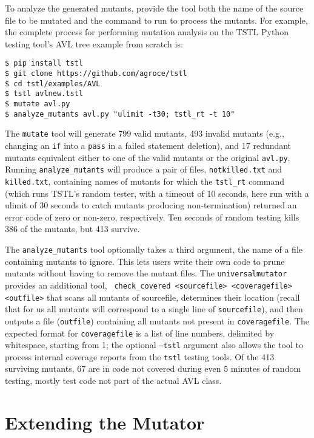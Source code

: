 To analyze the generated mutants, provide the tool both the name of the
source file to be mutated and the command to run to process the
mutants.  For example, the complete process for performing mutation
analysis on the TSTL \cite{tstlsttt,nfm15} Python testing tool's AVL tree example from scratch is:

{\scriptsize
\begin{verbatim}
$ pip install tstl
$ git clone https://github.com/agroce/tstl
$ cd tstl/examples/AVL
$ tstl avlnew.tstl
$ mutate avl.py
$ analyze_mutants avl.py "ulimit -t30; tstl_rt -t 10"
\end{verbatim}
}

The {\tt mutate} tool will generate 799 valid mutants, 493 invalid
mutants (e.g., changing an {\tt if} into a {\tt pass} in a failed
statement deletion), and 17 redundant mutants equivalent either to one
of the valid mutants or the original {\tt avl.py}.
Running {\tt analyze\_mutants} will produce a pair of files, {\tt notkilled.txt} and {\tt
  killed.txt}, containing names of mutants for which the {\tt tstl\_rt}
command (which runs TSTL's random tester, with a timeout of 10
seconds, here run with a ulimit of 30 seconds to catch mutants
producing non-termination)
returned an error code of zero or non-zero, respectively.  Ten seconds
of random testing kills 386 of the mutants, but 413 survive.

The {\tt analyze\_mutants} tool optionally takes a third argument, the
name of a file containing mutants to ignore.  This lets users write
their own code to prune mutants without having to remove the mutant
files.  The {\tt universalmutator} provides an additional tool, {\tt
  check\_covered <sourcefile> <coveragefile> <outfile>} that scans all
mutants of sourcefile, determines their location (recall that for us all mutants will correspond to a single line
of {\tt sourcefile}), and then outputs a file ({\tt outfile})
containing all mutants not present in {\tt coveragefile}.  The
expected format for {\tt coveragefile} is a list of line numbers,
delimited by whitespace, starting from 1; the optional {\tt --tstl}
argument also allows the tool to process internal coverage reports
from the {\tt tstl} testing tools.  Of the 413 surviving mutants, 67
are in code not covered during even 5 minutes of random testing, mostly test code not part of the actual AVL class.

\section{Extending the Mutator}

